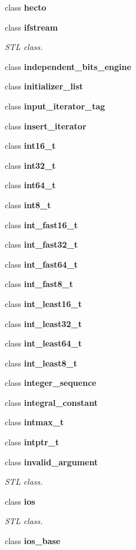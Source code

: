 \begin{DoxyCompactItemize}
\item 
class \textbf{ hecto}
\item 
class \textbf{ ifstream}
\begin{DoxyCompactList}\small\item\em S\+TL class. \end{DoxyCompactList}\item 
class \textbf{ independent\+\_\+bits\+\_\+engine}
\item 
class \textbf{ initializer\+\_\+list}
\item 
class \textbf{ input\+\_\+iterator\+\_\+tag}
\item 
class \textbf{ insert\+\_\+iterator}
\item 
class \textbf{ int16\+\_\+t}
\item 
class \textbf{ int32\+\_\+t}
\item 
class \textbf{ int64\+\_\+t}
\item 
class \textbf{ int8\+\_\+t}
\item 
class \textbf{ int\+\_\+fast16\+\_\+t}
\item 
class \textbf{ int\+\_\+fast32\+\_\+t}
\item 
class \textbf{ int\+\_\+fast64\+\_\+t}
\item 
class \textbf{ int\+\_\+fast8\+\_\+t}
\item 
class \textbf{ int\+\_\+least16\+\_\+t}
\item 
class \textbf{ int\+\_\+least32\+\_\+t}
\item 
class \textbf{ int\+\_\+least64\+\_\+t}
\item 
class \textbf{ int\+\_\+least8\+\_\+t}
\item 
class \textbf{ integer\+\_\+sequence}
\item 
class \textbf{ integral\+\_\+constant}
\item 
class \textbf{ intmax\+\_\+t}
\item 
class \textbf{ intptr\+\_\+t}
\item 
class \textbf{ invalid\+\_\+argument}
\begin{DoxyCompactList}\small\item\em S\+TL class. \end{DoxyCompactList}\item 
class {\bfseries ios}
\begin{DoxyCompactList}\small\item\em S\+TL class. \end{DoxyCompactList}\item 
class \textbf{ ios\+\_\+base}

\end{DoxyCompactItemize}
